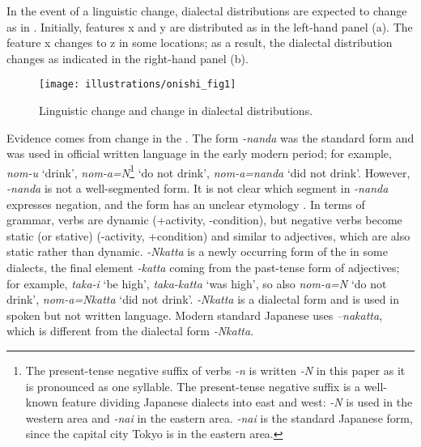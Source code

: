 \documentclass[output=paper]{LSP/langsci}
\begin{document}
In the event of a linguistic change, dialectal distributions are expected to change as in . Initially, features x and y are distributed as in the left-hand panel (a). The feature x changes to z in some locations; as a result, the dialectal distribution changes as indicated in the right-hand panel (b).

\begin{figure}
\texttt{[image: illustrations/onishi\_fig1]}
\caption{Linguistic change and change in dialectal distributions.}
\label{fig:onishi:1}
\end{figure}

Evidence comes from change in the . The form \textit{-nanda} was the standard form and was used in official written language in the early modern period; for example, \textit{nom-u} ‘drink’, \textit{nom-a=N}\footnote{ The present-tense negative suffix of verbs \textit{-n} is written \textit{-N} in this paper as it is pronounced as one syllable. The present-tense negative suffix is a well-known feature dividing Japanese dialects into east and west: \textit{-N} is used in the western area and \textit{-nai} in the eastern area. \textit{-nai} is the standard Japanese form, since the capital city Tokyo is in the eastern area.} ‘do not drink’, \textit{nom-a=nanda} ‘did not drink’. However, \textit{{}-nanda} is not a well-segmented form. It is not clear which segment in \textit{-nanda} expresses negation, and the form has an unclear etymology \citep{onishi_atarashii_1999}. In terms of grammar, verbs are dynamic (+activity, -condition), but negative verbs become static (or stative) (-activity, +condition) and similar to adjectives, which are also static rather than dynamic. \textit{-Nkatta} is a newly occurring form of the  in some dialects, the final element \textit{{}-katta} coming from the past-tense form of adjectives; for example, \textit{taka-i} ‘be high’, \textit{taka-katta} ‘was high’,  so also \textit{nom-a=N} ‘do not drink’, \textit{nom-a=Nkatta} ‘did not drink’. \textit{-Nkatta} is a dialectal form and is used in spoken but not written language. Modern standard Japanese uses \textit{–nakatta}, which is different from the dialectal form \textit{-Nkatta}. 
\end{document}
